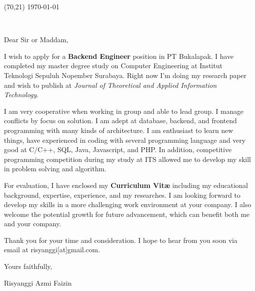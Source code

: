 \documentclass[letterpaper]{deedy-resume} %
\begin{document}
\begin{textblock}{25}(70,21)
\color{date}\fontsize{8pt}{10pt}\selectfont
\today
\end{textblock}


\begin{minipage}[t]{0.08\textwidth} %
\ 
\end{minipage}
\hfill

\begin{minipage}[t]{0.7\textwidth}

\sectionspace
\sectionspace
\sectionspace
{}
\sectionspace
\sectionspace
\sectionspace

Dear Sir or Maddam,
\sectionspace

I wish to apply for a \textbf{Backend Engineer} position in PT Bukalapak. I have completed my master degree study on Computer Engineering at Institut Teknologi Sepuluh Nopember Surabaya. Right now I'm doing my research paper and wish to publish at \textit{Journal of Theoretical and Applied Information Technology}.\sectionspace

I am very cooperative when working in group and able to lead group. I manage conflicts by focus on solution. I am adept at database, backend, and frontend programming with many kinds of architecture. I am enthusiast to learn new things, have experienced in coding with several programming language and very good at C/C++, SQL, Java, Javascript, and PHP. In addition, competitive programming competition during my study at ITS allowed me to develop my skill in problem solving and algorithm.
\sectionspace

For evaluation, I have enclosed my \textbf{Curriculum Vitæ} including my educational background, expertise, experience, and my researches. I am looking forward to develop my skills in a more challenging work environment at your company. I also welcome the potential growth for future advancement, which can benefit both me and your company.
\sectionspace

Thank you for your time and consideration. I hope to hear from you soon via email at risyanggi[at]gmail.com.\sectionspace

\sectionspace
\sectionspace
\sectionspace
\sectionspace
\sectionspace

Yours faithfully,
\sectionspace
\sectionspace
\sectionspace

Risyanggi Azmi Faizin
\end{minipage} %
\end{document}
